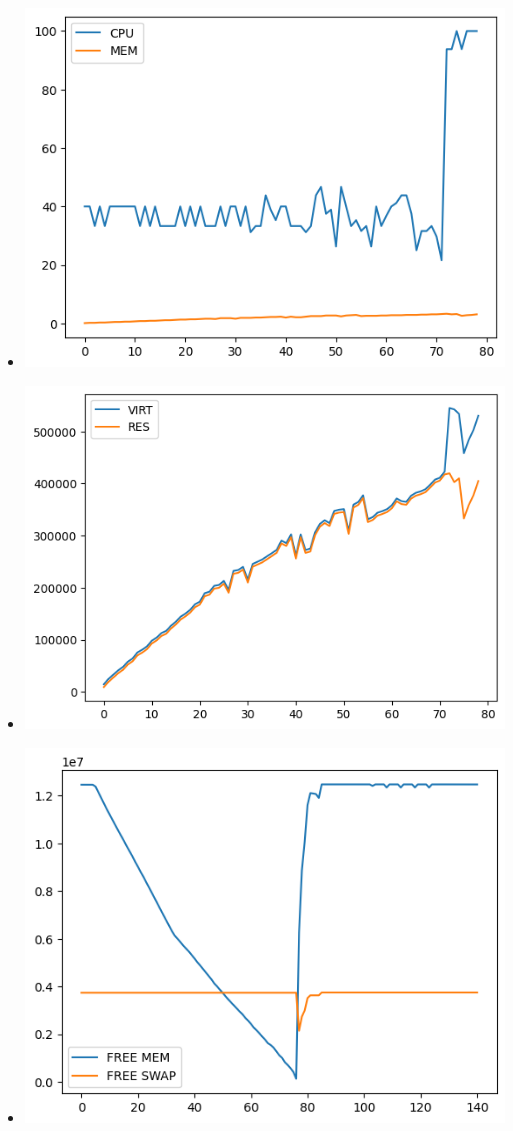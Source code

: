 \documentclass[10pt, a4paper]{article}
\begin{document}
\begin{itemize}
    \item \includegraphics[scale=0.8]{graphs/17.png}
    \item \includegraphics[scale=0.8]{graphs/18.png}
    \item \includegraphics[scale=0.8]{graphs/19.png}
\end{itemize}
\end{document}
